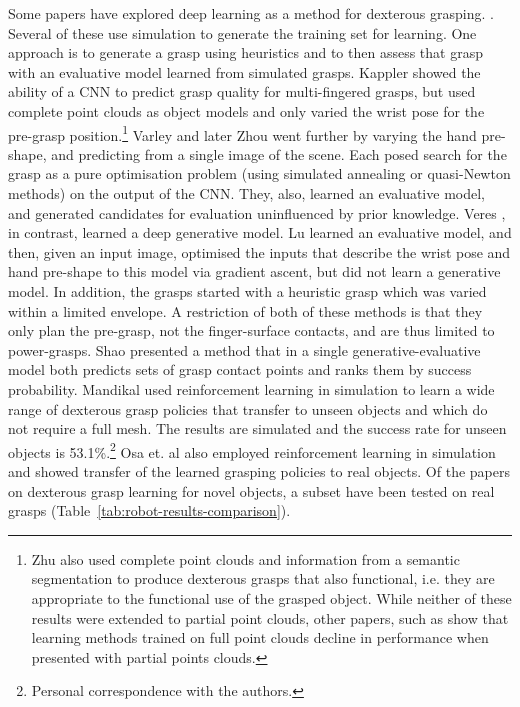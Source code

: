 Some papers have explored deep learning as a method for dexterous grasping. \cite{lu2017planning,varley2015generating,veres2017modeling,zhou20176dof,kappler2015leveraging,Zhu2021,Corsaro2021}. Several of these use simulation to generate the training set for learning. One approach \cite{Corsaro2021} is to generate a grasp using heuristics and to then assess that grasp with an evaluative model learned from simulated grasps. Kappler \cite{kappler2015leveraging} showed the ability of a CNN to predict grasp quality for multi-fingered grasps, but used complete point clouds as object models and only varied the wrist pose for the pre-grasp position.\footnote{Zhu \cite{Zhu2021} also used complete point clouds and information from a semantic segmentation to produce dexterous grasps that also functional, i.e. they are appropriate to the functional use of the grasped object. While neither of these results were extended to partial point clouds, other papers, such as \cite{kopicki2015ijrr} show that learning methods trained on full point clouds decline in performance when presented with partial points clouds.} Varley \cite{varley2015generating} and later Zhou \cite{zhou20176dof} went further by varying the hand pre-shape, and predicting from a single image of the scene. Each posed search for the grasp as a pure optimisation problem (using simulated annealing or quasi-Newton methods) on the output of the CNN. They, also, learned an evaluative model, and generated candidates for evaluation uninfluenced by prior knowledge. Veres \cite{veres2017modeling}, in contrast, learned a deep generative model. Lu \cite{lu2017planning} learned an evaluative model, and then, given an input image, optimised the inputs that describe the wrist pose and hand pre-shape to this model via gradient ascent, but did not learn a generative model. In addition, the grasps started with a heuristic grasp which was varied within a limited envelope. A restriction of both of these methods is that they only plan the pre-grasp, not the finger-surface contacts, and are thus limited to power-grasps. Shao \cite{Shao2020} presented a method that in a single generative-evaluative model both predicts sets of grasp contact points and ranks them by success probability. Mandikal \cite{mandikal2021dexterous} used reinforcement learning in simulation to learn a wide range of dexterous grasp policies that transfer to unseen objects and which do not require a full mesh. The results are simulated and the success rate for unseen objects is 53.1\%.\footnote{Personal correspondence with the authors.} Osa et. al \cite{Osa2018} also employed reinforcement learning in simulation and showed transfer of the learned grasping policies to real objects. Of the papers on dexterous grasp learning for novel objects, a subset have been tested on real grasps (Table~\ref{tab:robot-results-comparison}). 


